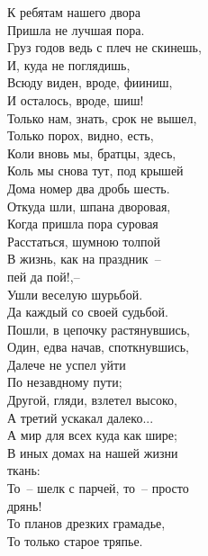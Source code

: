\begin{small}

\begin{multicols}{2}
    
\itshape
    
    \noindent
    К ребятам нашего двора \\
    Пришла не лучшая пора. \\
    \vfill
    \noindent
    Груз годов ведь с плеч не скинешь,\\
    И, куда не поглядишь,\\
    Всюду виден, вроде, фииниш,\\
    И осталось, вроде, шиш! \\
    \vfill
    \noindent
    Только нам, знать, срок не вышел,\\
    Только порох, видно, есть,\\
    Коли вновь мы, братцы, здесь,\\
    Коль мы снова тут, под крышей\\
    Дома номер два дробь шесть.\\
    \vfill
    \noindent
    Откуда шли, шпана дворовая,\\
    Когда пришла пора суровая\\
    Расстаться, шумною толпой\\
    В жизнь, как на праздник~-- \\
    \indent 
    пей да пой!,--\\
    Ушли веселую шурьбой.\\
    Да каждый со своей судьбой.\\
    \vfill
    \noindent
    Пошли, в цепочку растянувшись,\\
    Один, едва начав, споткнувшись,\\
    Далече не успел уйти\\
    По незавдному пути;\\
    Другой, гляди, взлетел высоко,\\
    А третий ускакал далеко...\\
    \vfill   
    \noindent 
    А мир для всех куда как шире;\\
    В иных домах на нашей жизни \\ \indent ткань:\\
    То~-- шелк с парчей, то~-- просто \\ \indent дрянь!\\
    То планов дрезких грамадье,\\
    То только старое тряпье.\\

\end{multicols}
\end{small}
